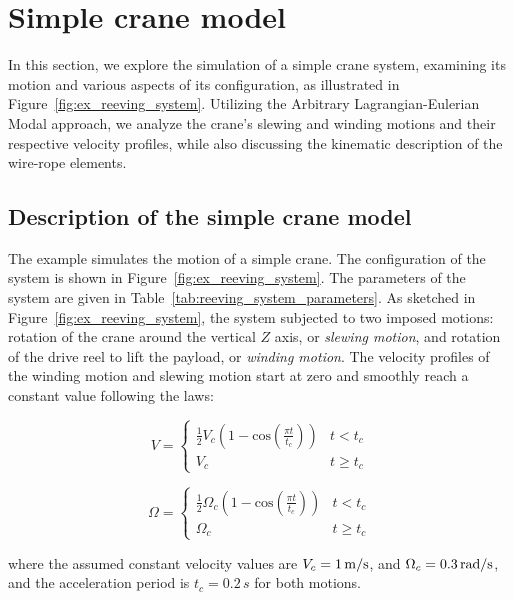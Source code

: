 \section{Simple crane model}\label{sec:craneSimulon}
In this section, we explore the simulation of a simple crane system, examining its motion and various aspects of its configuration, as illustrated in Figure~\ref{fig:ex_reeving_system}. Utilizing the Arbitrary Lagrangian-Eulerian Modal approach, we analyze the crane's slewing and winding motions and their respective velocity profiles, while also discussing the kinematic description of the wire-rope elements.

\subsection{Description of the simple crane model}
The example simulates the motion of a simple crane. The configuration of the system is shown in Figure~\ref{fig:ex_reeving_system}. The parameters of the system are given in Table~\ref{tab:reeving_system_parameters}. As sketched in Figure~\ref{fig:ex_reeving_system}, the system subjected to two imposed motions: rotation of the crane around the vertical $Z$ axis, or \textit{slewing motion}, and rotation of the drive reel to lift the payload, or \textit{winding motion}. The velocity profiles of the winding motion and slewing motion start at zero and smoothly reach a constant value following the laws: 

\begin{equation}
V = \left\{ {\begin{array}{*{20}{c}}
\frac{1}{2}V_c(1-\text{cos}(\frac{\pi t}{t_c}))&t < t_c\\
V_c&t \ge t_c
\end{array}} \right.
 \label{eq:rotation_angle}
\end{equation}


\begin{equation}
\Omega = \left\{ {\begin{array}{*{20}{c}}
\frac{1}{2}\Omega_c(1-\text{cos}(\frac{\pi t}{t_c}))&t < t_c\\
\Omega_c&t \ge t_c
\end{array}} \right.
 \label{eq:rotation_angle}
\end{equation}

\setlength{\parindent}{0cm}
where the assumed constant velocity values are $V_c = 1\, {\rm{m}}/{{\rm{s}}}$, and $\Omega_c = 0.3\, {\rm{rad}}/{{\rm{s}}}$, and the acceleration period is $t_c = 0.2 \,s$ for both motions.


